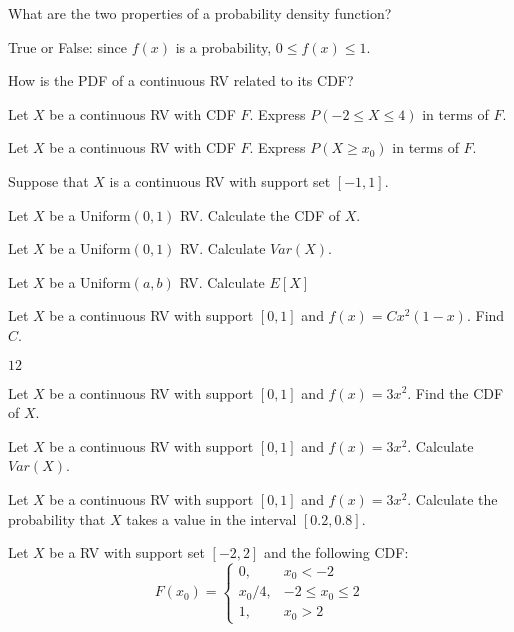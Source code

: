\documentclass[addpoints,12pt]{exam}
\begin{document}
\begin{questions}
\question What are the two properties of a probability density function? 

\question True or False: since $f(x)$ is a probability, $0\leq f(x) \leq 1$.

\question How is the PDF of a continuous RV related to its CDF?

\question Let $X$ be a continuous RV with CDF $F$. Express $P(-2 \leq X \leq 4)$ in terms of $F$.

\question Let $X$ be a continuous RV with CDF $F$. Express $P(X \geq x_0)$ in terms of $F$.

\question Suppose that $X$ is a continuous RV with support set $[-1,1]$.

\question Let $X$ be a Uniform$(0,1)$ RV. Calculate the CDF of $X$.

\question Let $X$ be a Uniform$(0,1)$ RV. Calculate $Var(X)$.

\question Let $X$ be a Uniform$(a,b)$ RV. Calculate $E[X]$

\question Let $X$ be a continuous RV with support $[0,1]$ and $f(x) = C x^2(1 - x)$. Find $C$.
\begin{solution}
  $12$
\end{solution}

\question Let $X$ be a continuous RV with support $[0,1]$ and $f(x) = 3x^2$. Find the CDF of $X$.

\question Let $X$ be a continuous RV with support $[0,1]$ and $f(x) = 3x^2$. Calculate $Var(X)$.

\question Let $X$ be a continuous RV with support $[0,1]$ and $f(x) = 3x^2$. Calculate the probability that $X$ takes a value in the interval $[0.2, 0.8]$.

\question Let $X$ be a RV with support set $[-2,2]$ and the following CDF:
\[
  F(x_0) = \left\{
  \begin{array}{rr}
    0, & x_0 < -2\\
    x_0/4, & -2 \leq x_0 \leq 2\\
    1, & x_0 > 2
  \end{array}
  \right.
\]
\begin{parts}

\end{parts}
\end{questions}
\end{document}
